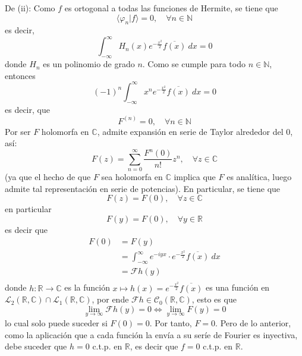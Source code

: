 \documentclass[12pt]{report}
\newcounter{it}
\theoremstyle{largebreak}
\newcommand\cf[3]{\ensuremath{#1:#2\rightarrow#3}}
\newcommand\pint[2]{\ensuremath{\langle#1| #2\rangle}}
\newcommand\conj[1]{\ensuremath{\overline{#1}}}
\newcommand{\fou}[1]{\ensuremath{\mathcal{F}#1}}
\begin{document}
\begin{sol}
        De (ii): Como $f$ es ortogonal a todas las funciones de Hermite, se tiene que
        \begin{equation*}
            \pint{\varphi_n}{f}=0,\quad\forall n\in\mathbb{N}
        \end{equation*}
        es decir,
        \begin{equation*}
            \int_{ -\infty}^{\infty}H_n(x)e^{ -\frac{x^2}{2}}\conj{f(x)}\:dx=0
        \end{equation*}
        donde $H_n$ es un polinomio de grado $n$. Como se cumple para todo $n\in\mathbb{N}$, entonces
        \begin{equation*}
            (-1)^n\int_{ -\infty}^{\infty}x^n e^{ -\frac{x^2}{2}}\conj{f(x)}\:dx=0
        \end{equation*}
        es decir, que
        \begin{equation*}
            F^(n)=0,\quad\forall n\in\mathbb{N}
        \end{equation*}
        Por ser $F$ holomorfa en $\mathbb{C}$, admite expansión en serie de Taylor alrededor del 0, así:
        \begin{equation*}
            F(z)=\sum_{ n=0}^\infty \frac{F^{n}(0)}{n!}z^n,\quad\forall z\in\mathbb{C}
        \end{equation*}
        (ya que el hecho de que $F$ sea holomorfa en $\mathbb{C}$ implica que $F$ es analítica, luego admite tal representación en serie de potencias). En particular, se tiene que
        \begin{equation*}
            F(z)=F(0),\quad\forall z\in\mathbb{C}
        \end{equation*}
        en particular
        \begin{equation*}
            F(y)=F(0),\quad\forall y\in\mathbb{R}
        \end{equation*}
        es decir que
        \begin{equation*}
            \begin{split}
                F(0)&=F(y)\\
                &=\int_{ -\infty}^{\infty}e^{ -iyx}\cdot e^{-\frac{x^2}{2}}\conj{f(x)}\:dx\\
                &=\fou{h}(y)\\
            \end{split}
        \end{equation*}
        donde $\cf{h}{\mathbb{R}}{\mathbb{C}}$ es la función $x\mapsto h(x)=e^{-\frac{x^2}{2}}\conj{f(x)}$ es una función en $\mathcal{L}_2(\mathbb{R},\mathbb{C})\cap\mathcal{L}_1(\mathbb{R},\mathbb{C})$, por ende $\fou{h}\in\mathcal{C}_0(\mathbb{R},\mathbb{C})$, esto es que
        \begin{equation*}
            \lim_{ y\rightarrow\infty}\fou{h}(y)=0\iff\lim_{ y\rightarrow\infty}F(y)=0
        \end{equation*}
        lo cual solo puede suceder si $F(0)=0$. Por tanto, $F=0$. Pero de lo anterior, como la aplicación que a cada función la envía a su seríe de Fourier es inyectiva, debe suceder que $h=0$ c.t.p. en $\mathbb{R}$, es decir que $f=0$ c.t.p. en $\mathbb{R}$.
    \end{sol}
\end{document}
